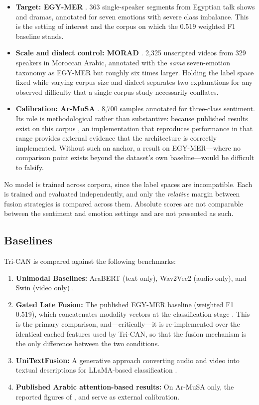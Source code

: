 \documentclass[12pt, a4paper]{article}
\begin{document}
\begin{itemize}
    \item \textbf{Target: EGY-MER} \citep{Hussein2025}. 363 single-speaker segments from Egyptian talk shows and dramas, annotated for seven emotions with severe class imbalance. This is the setting of interest and the corpus on which the 0.519 weighted F1 baseline stands.
    \item \textbf{Scale and dialect control: MORAD} \citep{Atou2026}. 2{,}325 unscripted videos from 329 speakers in Moroccan Arabic, annotated with the \emph{same} seven-emotion taxonomy as EGY-MER but roughly six times larger. Holding the label space fixed while varying corpus size and dialect separates two explanations for any observed difficulty that a single-corpus study necessarily conflates.
    \item \textbf{Calibration: Ar-MuSA} \citep{Khaled2025}. 8{,}700 samples annotated for three-class sentiment. Its role is methodological rather than substantive: because published results exist on this corpus \citep{Cheikhi2026, Cheikhi2026a, Cheikhi2026b}, an implementation that reproduces performance in that range provides external evidence that the architecture is correctly implemented. Without such an anchor, a result on EGY-MER---where no comparison point exists beyond the dataset's own baseline---would be difficult to falsify.
\end{itemize}

No model is trained across corpora, since the label spaces are incompatible. Each is trained and evaluated independently, and only the \emph{relative} margin between fusion strategies is compared across them. Absolute scores are not comparable between the sentiment and emotion settings and are not presented as such.

\subsection{Baselines}
Tri-CAN is compared against the following benchmarks:
\begin{enumerate}
    \item \textbf{Unimodal Baselines:} AraBERT (text only), Wav2Vec2 (audio only), and Swin (video only) \citep{Hussein2025}.
    \item \textbf{Gated Late Fusion:} The published EGY-MER baseline (weighted F1 0.519), which concatenates modality vectors at the classification stage \citep{Hussein2025}. This is the primary comparison, and---critically---it is re-implemented over the identical cached features used by Tri-CAN, so that the fusion mechanism is the only difference between the two conditions.
    \item \textbf{UniTextFusion:} A generative approach converting audio and video into textual descriptions for LLaMA-based classification \citep{KhaledUniText2025}.
    \item \textbf{Published Arabic attention-based results:} On Ar-MuSA only, the reported figures of \citet{Cheikhi2026}, \citet{Cheikhi2026a} and \citet{Cheikhi2026b} serve as external calibration.
\end{enumerate}
\end{document}
